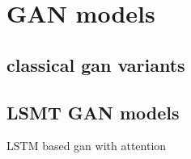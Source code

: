 \section{GAN models}

\subsection{classical gan variants}

\subsection{LSMT GAN models}

LSTM based gan with attention \cite{bashar2023algan} 